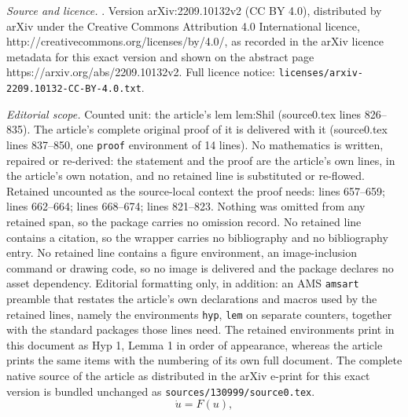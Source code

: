 \documentclass[10pt,a4paper]{amsart}
\title{\vspace{-.4in}{\fontsize{18}{18}\selectfont \textbf{Saddle Transport and Chaos in the Double Pendulum}}\vspace{-.15in}}
\author{Kadierdan Kaheman, Jason J. Bramburger, J. Nathan Kutz, Steven L. Brunton}
\date{Source: arXiv:2209.10132v2 (CC BY 4.0)}
\begin{document}
\maketitle

\noindent\emph{Source and licence.} \vspace{-.15in}. Version arXiv:2209.10132v2 (CC BY 4.0), distributed by arXiv under the Creative Commons Attribution 4.0 International licence, http://creativecommons.org/licenses/by/4.0/, as recorded in the arXiv licence metadata for this exact version and shown on the abstract page https://arxiv.org/abs/2209.10132v2. Full licence notice: \texttt{licenses/arxiv-2209.10132-CC-BY-4.0.txt}.\par\smallskip

\noindent\textit{Editorial scope.} Counted unit: the article's lem lem:Shil (source0.tex lines 826--835). The article's complete original proof of it is delivered with it (source0.tex lines 837--850, one \texttt{proof} environment of 14 lines). No mathematics is written, repaired or re-derived: the statement and the proof are the article's own lines, in the article's own notation, and no retained line is substituted or re-flowed.  Retained uncounted as the source-local context the proof needs: lines 657--659; lines 662--664; lines 668--674; lines 821--823.  Nothing was omitted from any retained span, so the package carries no omission record.  No retained line contains a citation, so the wrapper carries no bibliography and no bibliography entry.  No retained line contains a figure environment, an image-inclusion command or drawing code, so no image is delivered and the package declares no asset dependency.  Editorial formatting only, in addition: an AMS \texttt{amsart} preamble that restates the article's own declarations and macros used by the retained lines, namely the environments \texttt{hyp}, \texttt{lem} on separate counters, together with the standard packages those lines need.  The retained environments print in this document as Hyp 1, Lemma 1 in order of appearance, whereas the article prints the same items with the numbering of its own full document.  The complete native source of the article as distributed in the arXiv e-print for this exact version is bundled unchanged as \texttt{sources/130999/source0.tex}.
\begin{equation}\label{ODE}
	\dot{u} = F(u),
\end{equation}
\end{document}
